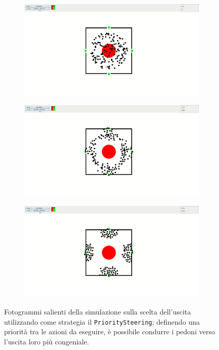 \begin{figure}
    \centering
    \begin{subfigure}[b]{0.75\textwidth}
        \centering
        \includegraphics[width=\textwidth]{immagini/casi-studio/multiple-exits-priority-begin.png}
    \end{subfigure}
    \hfill
    \begin{subfigure}[b]{0.75\textwidth}
        \centering
        \includegraphics[width=\textwidth]{immagini/casi-studio/multiple-exits-priority-during.png}
    \end{subfigure}
    \hfill
    \begin{subfigure}[b]{0.75\textwidth}
        \centering
        \includegraphics[width=\textwidth]{immagini/casi-studio/multiple-exits-priority-end.png}
    \end{subfigure}
    \caption{Fotogrammi salienti della simulazione sulla scelta dell'uscita utilizzando come strategia il \texttt{PrioritySteering}; definendo una priorità tra le azioni da eseguire, è possibile condurre i pedoni verso l'uscita loro più congeniale.}
    \label{fig:multiple-exits-priority}
\end{figure}